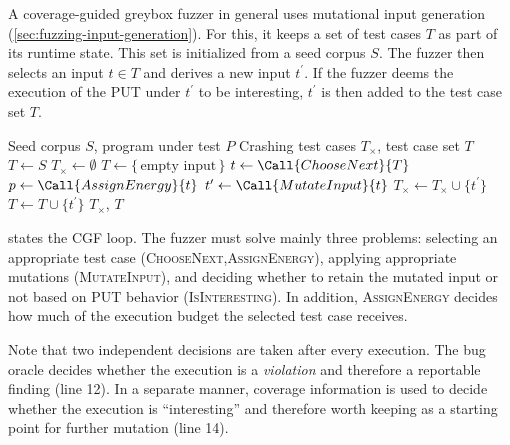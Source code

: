 A coverage-guided greybox fuzzer in general uses mutational input generation
(\cref{sec:fuzzing-input-generation}).
For this, it keeps a set of test cases $T$ as part of its runtime state.
This set is initialized from a seed corpus $S$.
The fuzzer then selects an input $t\in T$ and derives a new input $t^\prime$.
If the fuzzer deems the execution of the PUT under $t^\prime$ to be interesting, $t^\prime$
is then added to the test case set $T$.

\begin{algorithm}[H]
  \caption{Coverage-guided greybox fuzzing, following \textcite{bohme_coverage-based_2016}.}
  \label{alg:cgf}
  \begin{algorithmic}[1]
    \Require Seed corpus $S$, program under test $P$
    \Ensure Crashing test cases $T_\times$, test case set $T$
    \State $T \gets S$
    \State $T_\times \gets \emptyset$
      \State $T \gets \{\,\text{empty input}\,\}$
    \EndIf
    \Repeat
      \State $t \gets \Call{ChooseNext}{T}$
      \State $p \gets \Call{AssignEnergy}{t}$
        \State $t^\prime \gets \Call{MutateInput}{t}$
          \State $T_\times \gets T_\times \cup \{t^\prime\}$
          \State $T \gets T \cup \{t^\prime\}$
        \EndIf
      \EndFor
    \State \Return $T_\times$, $T$
  \end{algorithmic}
\end{algorithm}

 states the CGF loop.
The fuzzer must solve mainly three problems: selecting an appropriate
test case (\textsc{ChooseNext},\textsc{AssignEnergy}), applying appropriate mutations (\textsc{MutateInput}), and deciding whether to retain the
mutated input or not based on PUT behavior (\textsc{IsInteresting}).
In addition, \textsc{AssignEnergy} decides how much of the execution budget the selected test case receives.

Note that two independent decisions are taken after every execution.
The bug oracle decides whether the execution is a
\emph{violation} and therefore a reportable finding (line 12).
In a separate manner, coverage information
is used to decide whether the execution is \enquote{interesting} and therefore worth keeping as a starting point for
further mutation (line 14).

